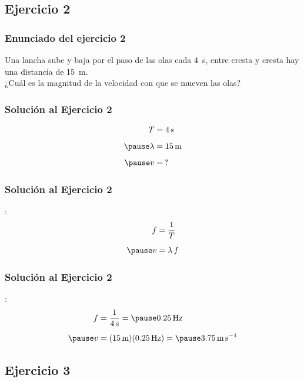\documentclass[14pt]{beamer}
\begin{document}
\subsection{Ejercicio 2}

\begin{frame}
\frametitle{Enunciado del ejercicio 2}
Una lancha sube y baja por el paso de las olas cada \SI{4}{\second}, entre cresta y cresta hay una distancia de \SI{15}{\meter}.
\\
\bigskip
\pause
¿Cuál es la magnitud de la velocidad con que se mueven las olas?
\end{frame}
\begin{frame}
\frametitle{Solución al Ejercicio 2}
\pause
\begin{eqnarray*}
\begin{aligned}
T &= \SI{4}{\second} \\[0.5em] \pause
\lambda &= \SI{15}{\meter} \\[0.5em] \pause
v &= \, ?
\end{aligned}
\end{eqnarray*}
\end{frame}
\begin{frame}
\frametitle{Solución al Ejercicio 2}
:
\pause
\begin{eqnarray*}
\begin{aligned}
f &= \dfrac{1}{T} \\[0.5em] \pause
v &= \lambda \, f
\end{aligned}
\end{eqnarray*}
\end{frame}
\begin{frame}
\frametitle{Solución al Ejercicio 2}
:
\pause
\begin{eqnarray*}
\begin{aligned}
f &= \dfrac{1}{\SI{4}{\second}} = \pause \SI{0.25}{\hertz} \\[0.5em] \pause
v &= (\SI{15}{\meter})(\SI{0.25}{\hertz}) = \pause \SI{3.75}{\meter\per\second}
\end{aligned}
\end{eqnarray*}
\end{frame}

\subsection{Ejercicio 3}
\end{document}
